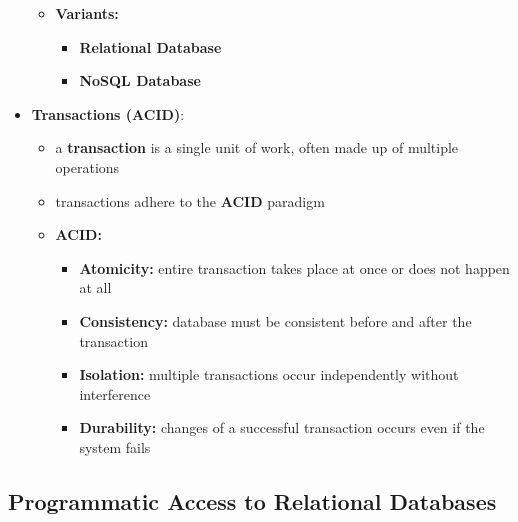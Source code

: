 \documentclass[ieeetran]{article}
\begin{document}
\begin{itemize}
\begin{itemize}
	\item \textbf{Variants:}
		\begin{itemize}
		  \item \textbf{Relational Database}
		\item \textbf{NoSQL Database}
		\end{itemize}
	\end{itemize}

\item \textbf{Transactions (ACID)}:
	\begin{itemize}
	  \item a \textbf{transaction} is a single unit of work, often made up of multiple operations
	\item transactions adhere to the \textbf{ACID} paradigm
	\item \textbf{ACID:}
		\begin{itemize}
		  \item \textbf{Atomicity:} entire transaction takes place at once or does not happen at all
		\item \textbf{Consistency:} database must be consistent before and after the transaction

		\item \textbf{Isolation:} multiple transactions occur independently without interference
		\item \textbf{Durability:} changes of a successful transaction occurs even if the system fails
		\end{itemize}
	\end{itemize}
\end{itemize}


\subsection{Programmatic Access to Relational Databases} %
\label{sub:programmatic_access_to_relational_databases}
\end{document}
